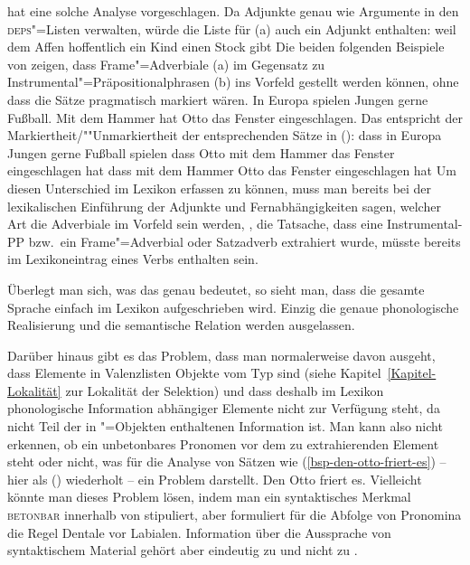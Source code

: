 \zl
\citet{Uszkoreit86b} hat eine solche Analyse vorgeschlagen.
Da \citet*{BMS2001a} Adjunkte genau wie Argumente in den \textsc{deps}"=Listen verwalten, würde die Liste
für (a) auch ein Adjunkt enthalten:
\eal
\ex weil dem Affen hoffentlich ein Kind einen Stock gibt
\ex {}
\zl
\largerpage
Die beiden folgenden Beispiele von \citet[]{Frey2004a} zeigen, dass
Frame"=Adverbiale (a) im Gegensatz zu Instrumental"=Präpositionalphrasen (b) ins
Vorfeld gestellt werden können, ohne dass die Sätze pragmatisch markiert wären.
\eal
\ex In Europa spielen Jungen gerne Fußball. 
\ex Mit dem Hammer hat Otto das Fenster eingeschlagen.
\zl
Das entspricht der Markiertheit/""Unmarkiertheit der entsprechenden Sätze in ():
\eal
\ex dass in Europa Jungen gerne Fußball spielen
\ex dass Otto mit dem Hammer das Fenster eingeschlagen hat
\ex dass mit dem Hammer Otto das Fenster eingeschlagen hat
\zl
Um diesen Unterschied im Lexikon erfassen zu können, muss man bereits bei der lexikalischen
Einführung der Adjunkte und Fernabhängigkeiten sagen, welcher Art die Adverbiale im Vorfeld
sein werden, \dash, die Tatsache, dass eine Instrumental-PP bzw.\ ein Frame"=Adverbial oder Satzadverb
extrahiert wurde, müsste bereits im Lexikoneintrag eines Verbs enthalten sein.

Überlegt man sich, was das genau bedeutet, so sieht man, dass die gesamte Sprache einfach im Lexikon
aufgeschrieben wird. Einzig die genaue phonologische Realisierung und die semantische Relation
werden ausgelassen. 

Darüber hinaus gibt es das Problem, dass man normalerweise davon ausgeht, dass Elemente in Valenzlisten
Objekte vom Typ  sind (siehe Kapitel~\ref{Kapitel-Lokalität} zur Lokalität der Selektion)
und dass deshalb im Lexikon phonologische Information abhängiger Elemente nicht zur Verfügung steht,
da \phon nicht Teil der in "=Objekten enthaltenen Information ist. Man kann also nicht
erkennen, ob ein unbetonbares Pronomen vor dem zu extrahierenden Element steht oder nicht, was für
die Analyse von Sätzen wie (\ref{bsp-den-otto-friert-es}) -- hier als () wiederholt -- ein
Problem darstellt. 
\largerpage
\ea
\label{bsp-den-otto-friert-es-zwei}
Den Otto friert es.
\z
Vielleicht könnte man dieses Problem lösen, indem man ein syntaktisches Merkmal \textsc{betonbar}
innerhalb von \synsem stipuliert, aber \citet[]{Abraham95a-u} formuliert für die Abfolge
von Pronomina die Regel Dentale vor Labialen. Information über die Aussprache von syntaktischem
Material gehört aber eindeutig zu \phon und nicht zu \synsem.
%
%
%
%



